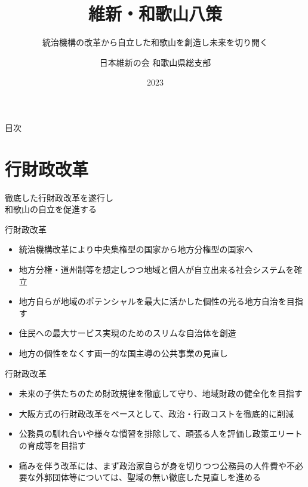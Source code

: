 \documentclass[dvipdfmx]{beamer}
\title{維新・和歌山八策}
\subtitle{統治機構の改革から自立した和歌山を創造し未来を切り開く}
\author{日本維新の会 和歌山県総支部}
\date{2023}
\begin{document}
\maketitle

\begin{frame}{目次}
    \tableofcontents
\end{frame}

\section{行財政改革}
    \begin{frame}{}{}
        \sectionpage
        \begin{center}
            \begin{large}
                \alert{徹底した行財政改革を遂行し}\\\alert{和歌山の自立を促進する}
            \end{large}
        \end{center}
    \end{frame}

    \begin{frame}{行財政改革}{}
        \begin{small}
            \begin{itemize}
                \setlength{\parsep}{.5mm}
                \setlength{\itemsep}{2mm}
                \item 統治機構改革により中央集権型の国家から地方分権型の国家へ
                \item 地方分権・道州制等を想定しつつ地域と個人が自立出来る社会システムを確立
                \item 地方自らが地域のポテンシャルを最大に活かした個性の光る地方自治を目指す
                \item 住民への最大サービス実現のためのスリムな自治体を創造
                \item 地方の個性をなくす画一的な国主導の公共事業の見直し
            \end{itemize}
        \end{small}
    \end{frame}

    \begin{frame}{行財政改革}{}
        \begin{small}
            \begin{itemize}
                \setlength{\parsep}{.5mm}
                \setlength{\itemsep}{2mm}
                \item 未来の子供たちのため財政規律を徹底して守り、地域財政の健全化を目指す
                \item 大阪方式の行財政改革をベースとして、政治・行政コストを徹底的に削減
                \item 公務員の馴れ合いや様々な慣習を排除して、頑張る人を評価し政策エリートの育成等を目指す
                \item 痛みを伴う改革には、まず政治家自らが身を切りつつ公務員の人件費や不必要な外郭団体等については、聖域の無い徹底した見直しを進める
            \end{itemize}
        \end{small}
    \end{frame}
    
\end{document}
